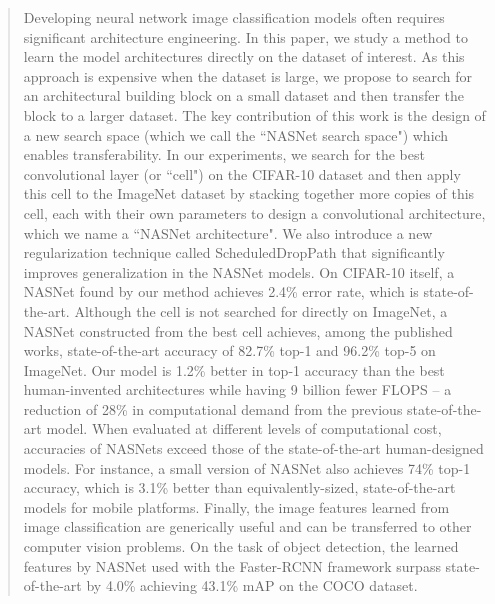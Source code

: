 \begin{abstract}
 Developing neural network image classification models often requires significant architecture engineering.  In this paper, we study a method to learn the model architectures directly on the dataset of interest. As this approach is expensive when the dataset is large, we propose to search for an architectural building block on a small dataset and then transfer the block to a larger dataset. The key contribution of this work is the design of a new search space (which we call the ``NASNet search space") which enables transferability.
 In our experiments, we search for the best convolutional layer (or ``cell") on the CIFAR-10 dataset and then apply this cell to the ImageNet dataset by stacking together more copies of this cell, each with their own parameters to design a convolutional architecture, which we name a ``NASNet architecture". We also introduce a new regularization technique called ScheduledDropPath that significantly improves generalization in the NASNet models. On CIFAR-10 itself, a NASNet found by our method achieves 2.4\% error rate, which is state-of-the-art. Although the cell is not searched for directly on ImageNet, a NASNet constructed from the best cell achieves, among the published works, state-of-the-art accuracy of 82.7\% top-1 and 96.2\% top-5 on ImageNet. Our model is 1.2\% better in top-1 accuracy than the best human-invented architectures while having 9 billion fewer FLOPS -- a reduction of 28\% in computational demand from the previous state-of-the-art model.  When evaluated at different levels of computational cost, accuracies of NASNets exceed those of the state-of-the-art human-designed models. For instance, a small version of NASNet also achieves 74\% top-1 accuracy, which is 3.1\% better than equivalently-sized, state-of-the-art models for mobile platforms.
 Finally, the image features learned from image classification are generically useful and can be transferred to other computer vision problems. On the task of object detection, the learned features by NASNet used with the Faster-RCNN framework surpass state-of-the-art by 4.0\% achieving 43.1\% mAP on the COCO dataset.
  
  \end{abstract}
